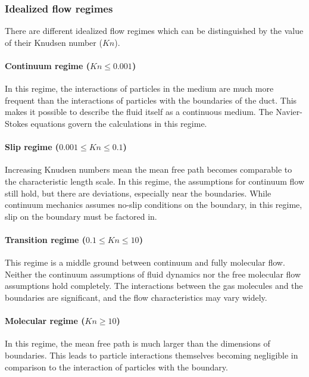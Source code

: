 \subsubsection{Idealized flow regimes}

	There are different idealized flow regimes which can be distinguished by the value of their Knudsen number (\(Kn\)).

\paragraph{Continuum regime (\(Kn \leq 0.001\))}
	
	In this regime, the interactions of particles in the medium are much more frequent than the interactions of particles with the boundaries of the duct. This makes it possible to describe the fluid itself as a continuous medium. The Navier-Stokes equations govern the calculations in this regime.

\paragraph{Slip regime (\(0.001 \leq Kn \leq 0.1\))}

	Increasing Knudsen numbers mean the mean free path becomes comparable to the characteristic length scale. In this regime, the assumptions for continuum flow still hold, but there are deviations, especially near the boundaries. While continuum mechanics assumes no-slip conditions on the boundary, in this regime, slip on the boundary must be factored in.

\paragraph{Transition regime (\(0.1 \leq Kn \leq 10\))}
	
	This regime is a middle ground between continuum and fully molecular flow. Neither the continuum assumptions of fluid dynamics nor the free molecular flow assumptions hold completely. The interactions between the gas molecules and the boundaries are significant, and the flow characteristics may vary widely.

\paragraph{Molecular regime (\(Kn \geq 10\))}

	In this regime, the mean free path is much larger than the dimensions of boundaries. This leads to particle interactions themselves becoming negligible in comparison to the interaction of particles with the boundary.

